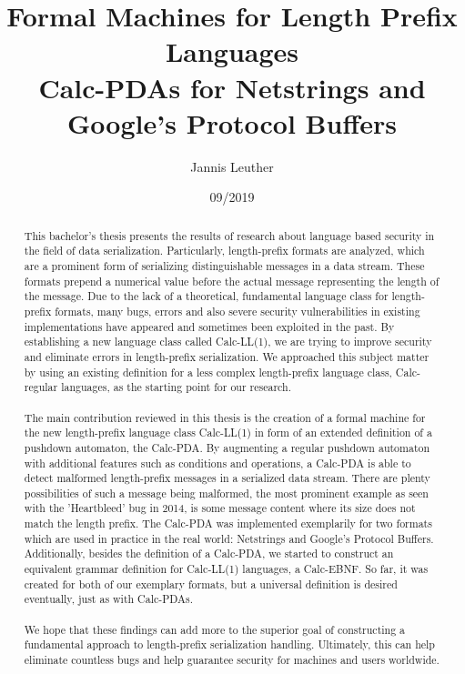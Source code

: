 \documentclass[a4paper]{article}
\begin{document}
\title{Formal Machines for Length Prefix Languages\\{\small Calc-PDAs for Netstrings and Google's Protocol Buffers}}
\author{Jannis Leuther}
\date{09/2019}

\maketitle

\begin{abstract}
    This bachelor's thesis presents the results of research about language based security in the field of data serialization. Particularly, length-prefix formats are analyzed, which are a prominent form of serializing distinguishable messages in a data stream. These formats prepend a numerical value before the actual message representing the length of the message. Due to the lack of a theoretical, fundamental language class for length-prefix formats, many bugs, errors and also severe security vulnerabilities in existing implementations have appeared and sometimes been exploited in the past. By establishing a new language class called Calc-LL(1), we are trying to improve security and eliminate errors in length-prefix serialization. We approached this subject matter by using an existing definition for a less complex length-prefix language class, Calc-regular languages, as the starting point for our research. \\\\
    The main contribution reviewed in this thesis is the creation of a formal machine for the new length-prefix language class Calc-LL(1) in form of an extended definition of a pushdown automaton, the Calc-PDA. By augmenting a regular pushdown automaton with additional features such as conditions and operations, a Calc-PDA is able to detect malformed length-prefix messages in a serialized data stream. There are plenty possibilities of such a message being malformed, the most prominent example as seen with the 'Heartbleed' bug in 2014, is some message content where its size does not match the length prefix. The Calc-PDA was implemented exemplarily for two formats which are used in practice in the real world: Netstrings and Google's Protocol Buffers. Additionally, besides the definition of a Calc-PDA, we started to construct an equivalent grammar definition for Calc-LL(1) languages, a Calc-EBNF. So far, it was created for both of our exemplary formats, but a universal definition is desired eventually, just as with Calc-PDAs.\\\\
    We hope that these findings can add more to the superior goal of constructing a fundamental approach to length-prefix serialization handling. Ultimately, this can help eliminate countless bugs and help guarantee security for machines and users worldwide.
\end{abstract}
\end{document}
